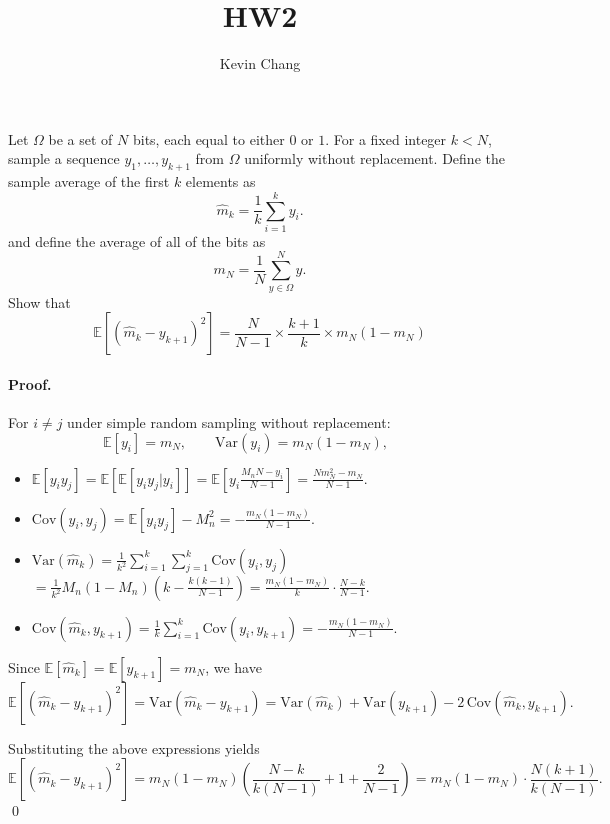 \documentclass[a4paper]{article}
\title{HW2}
\author{Kevin Chang}
\begin{document}
\maketitle

\section{}
Let $\Omega$ be a set of $N$ bits, each equal to either $0$ or $1$.
For a fixed integer $k < N$, sample a sequence $y_1 , \dots , y_{k+1}$ from $\Omega$ uniformly without replacement.
Define the sample average of the first $k$ elements as
$$\hat{m}_k = \frac{1}{k} \sum_{i=1}^k y_i.$$
and define the average of all of the bits as
$$m_N = \frac{1}{N} \sum_{y\in\Omega}^N y.$$
Show that
$$\mathbb{E}[(\hat{m}_k - y_{k+1})^2] = \frac{N}{N-1} \times \frac{k+1}{k} \times m_N (1 - m_N)$$

\paragraph{Proof.}
For $i \neq j$ under simple random sampling without replacement:
\[
\mathbb{E}[y_i] = m_N, 
\qquad 
\mathrm{Var}(y_i) = m_N(1-m_N), 
\qquad 
\]
\begin{itemize}
    \item $\mathbb{E}[y_i y_j] = \mathbb{E}[\mathbb{E}[y_i y_j|y_i]] = \mathbb{E}[y_i \frac{M_n N - y_i}{N-1}] =\frac{N m_N^2 - m_N}{N-1}.$
    \item $\mathrm{Cov}(y_i,y_j) = \mathbb{E}[y_i y_j] - M_n^2 = -\frac{m_N(1-m_N)}{N-1}.$
    \item $\mathrm{Var}(\hat m_k) = \frac{1}{k^2}\sum_{i=1}^k \sum_{j=1}^k \mathrm{Cov}(y_i,y_j)$ 
        $= \frac{1}{k^2}M_n(1-M_n)(k - \frac{k(k-1)}{N-1}) = \frac{m_N(1-m_N)}{k}\cdot \frac{N-k}{N-1}.$
    \item $\mathrm{Cov}(\hat m_k, y_{k+1}) = \frac{1}{k}\sum_{i=1}^k \mathrm{Cov}(y_i, y_{k+1}) = -\frac{m_N(1-m_N)}{N-1}.$
\end{itemize}

Since $\mathbb{E}[\hat m_k] = \mathbb{E}[y_{k+1}] = m_N$, we have
\[
\mathbb{E}\!\left[(\hat m_k - y_{k+1})^2\right] 
= \mathrm{Var}(\hat m_k - y_{k+1})
= \mathrm{Var}(\hat m_k) + \mathrm{Var}(y_{k+1}) - 2\,\mathrm{Cov}(\hat m_k,y_{k+1}).
\]

Substituting the above expressions yields
\[
\mathbb{E}\!\left[(\hat m_k - y_{k+1})^2\right]
= m_N(1-m_N)\left(\frac{N-k}{k(N-1)} + 1 + \frac{2}{N-1}\right)
= m_N(1-m_N)\cdot \frac{N(k+1)}{k(N-1)}.
\]
\qed
\end{document}
